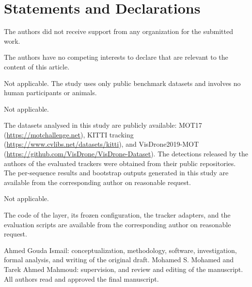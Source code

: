 \documentclass[pdflatex,referee,sn-mathphys-num]{sn-jnl}
\begin{document}
\maketitle











\backmatter

\section*{Statements and Declarations}

The authors did not receive support from any organization for the submitted work.

The authors have no competing interests to declare that are relevant to the content of this
article.

Not applicable. The study uses only public benchmark datasets and involves no human participants
or animals.

Not applicable.

The datasets analysed in this study are publicly available: MOT17
(\url{https://motchallenge.net}), KITTI tracking (\url{https://www.cvlibs.net/datasets/kitti}), and
VisDrone2019-MOT (\url{https://github.com/VisDrone/VisDrone-Dataset}).
The detections released by the authors of the evaluated trackers were obtained from their public
repositories. The per-sequence results and bootstrap outputs generated in this study are available
from the corresponding author on reasonable request.

Not applicable.

The code of the layer, its frozen configuration, the tracker adapters, and the evaluation scripts
are available from the corresponding author on reasonable request.

Ahmed Gouda Ismail: conceptualization, methodology, software, investigation, formal analysis, and
writing of the original draft. Mohamed S. Mohamed and Tarek Ahmed Mahmoud: supervision, and
review and editing of the manuscript. All authors read and approved the final manuscript.


\end{document}
